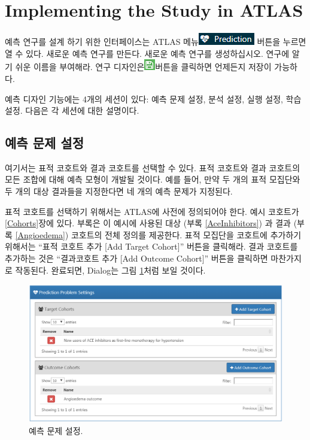 \documentclass[11pt]{book}
\theoremstyle{definition}
\theoremstyle{definition}
\theoremstyle{definition}
\theoremstyle{remark}
\begin{document}
\section{Implementing the Study in
ATLAS}\label{implementing-the-study-in-atlas}

예측 연구를 설계 하기 위한 인터페이스는 ATLAS
메뉴\includegraphics{images/PatientLevelPrediction/predictionButton.png}
버튼을 누르면 열 수 있다. 새로운 예측 연구를 만든다. 새로운 예측 연구를
생성하십시오. 연구에 알기 쉬운 이름을 부여해라. 연구
디자인은\includegraphics{images/PopulationLevelEstimation/save.png}버튼을
클릭하면 언제든지 저장이 가능하다. 

예측 디자인 기능에는 4개의 세션이 있다: 예측 문제 설정, 분석 설정, 실행
설정, 학습 설정. 다음은 각 세션에 대한 설명이다.

\subsection{예측 문제 설정}\label{--}

여기서는 표적 코호트와 결과 코호트를 선택할 수 있다. 표적 코호트와 결과
코호트의 모든 조합에 대해 예측 모형이 개발될 것이다. 예를 들어, 만약 두
개의 표적 모집단와 두 개의 대상 결과들을 지정한다면 네 개의 예측 문제가
지정된다.

표적 코호트를 선택하기 위해서는 ATLAS에 사전에 정의되어야 한다. 예시
코호트가 \ref{Cohorts}장에 있다. 부록은 이 예시에 사용된 대상 (부록
\ref{AceInhibitors}) 과 결과 (부록 \ref{Angioedema}) 코호트의 전체
정의를 제공한다. 표적 모집단을 코호트에 추가하기 위해서는 ``표적 코호트
추가 {[}Add Target Cohort{]}'' 버튼을 클릭해라. 결과 코호트를 추가하는
것은 ``결과코호트 추가 {[}Add Outcome Cohort{]}'' 버튼을 클릭하면
마찬가지로 작동된다. 완료되면, Dialog는 그림
\ref{fig:problemSettings}처럼 보일 것이다.

\begin{figure}

{\centering \includegraphics[width=1\linewidth]{images/PatientLevelPrediction/problemSettings} 

}

\caption{예측 문제 설정.}\label{fig:problemSettings}
\end{figure}
\end{document}
